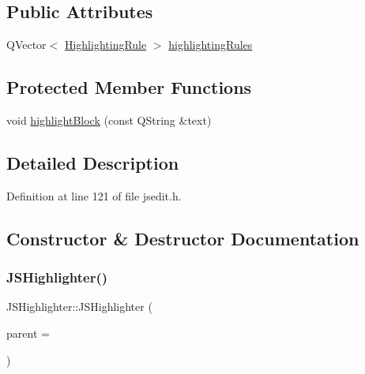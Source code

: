 \subsection*{Public Attributes}
\begin{DoxyCompactItemize}
\item 
Q\+Vector$<$ \hyperlink{struct_j_s_highlighter_1_1_highlighting_rule}{Highlighting\+Rule} $>$ \hyperlink{class_j_s_highlighter_a42499ae459e9a65266f1a08e7cd7d214}{highlighting\+Rules}
\end{DoxyCompactItemize}
\subsection*{Protected Member Functions}
\begin{DoxyCompactItemize}
\item 
void \hyperlink{class_j_s_highlighter_affb286d1e0dc29cabcc336a3ef13cc23}{highlight\+Block} (const Q\+String \&text)
\end{DoxyCompactItemize}


\subsection{Detailed Description}


Definition at line 121 of file jsedit.\+h.



\subsection{Constructor \& Destructor Documentation}
\mbox{\label{class_j_s_highlighter_a0b110ce0492f6ac3c2310de65fcd7919}} 
\subsubsection{\texorpdfstring{J\+S\+Highlighter()}{JSHighlighter()}\hspace{0.1cm}{\footnotesize\ttfamily [1/2]}}
{\footnotesize\ttfamily J\+S\+Highlighter\+::\+J\+S\+Highlighter (\begin{DoxyParamCaption}\item[{Q\+Text\+Document $\ast$}]{parent = {} }\end{DoxyParamCaption})}



